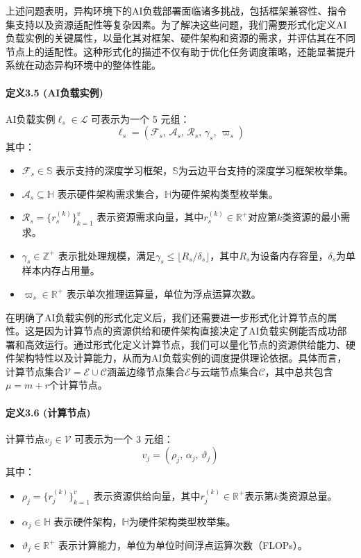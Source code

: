 上述问题表明，异构环境下的AI负载部署面临诸多挑战，包括框架兼容性、指令集支持以及资源适配性等复杂因素。为了解决这些问题，我们需要形式化定义AI负载实例的关键属性，以量化其对框架、硬件架构和资源的需求，并评估其在不同节点上的适配性。这种形式化的描述不仅有助于优化任务调度策略，还能显著提升系统在动态异构环境中的整体性能。

\paragraph{定义3.5 (AI负载实例)} AI负载实例$\ell_s \in \mathcal{L}$ 可表示为一个 5 元组：
\[
\ell_s = (\mathcal{F}_s,\, \mathcal{A}_s,\, \mathcal{R}_s,\, \gamma_s,\, \varpi_s)
\]
其中：
\begin{itemize}
    \item $\mathcal{F}_s \in \mathbb{S}$ 表示支持的深度学习框架，$\mathbb{S}$为云边平台支持的深度学习框架枚举集。
    \item $\mathcal{A}_s \subseteq \mathbb{H}$ 表示硬件架构需求集合，$\mathbb{H}$为硬件架构类型枚举集。
    \item $\mathcal{R}_s = \{r^{(k)}_s\}_{k=1}^v$ 表示资源需求向量，其中$r^{(k)}_s \in \mathbb{R}^+$对应第$k$类资源的最小需求。
    \item $\gamma_s \in \mathbb{Z}^+$ 表示批处理规模，满足$\gamma_s \leq \lfloor R_s/\delta_s \rfloor$，其中$R_s$为设备内存容量，$\delta_s$为单样本内存占用量。
    \item $\varpi_s \in \mathbb{R}^+$ 表示单次推理运算量，单位为浮点运算次数。
\end{itemize}

在明确了AI负载实例的形式化定义后，我们还需要进一步形式化计算节点的属性。这是因为计算节点的资源供给和硬件架构直接决定了AI负载实例能否成功部署和高效运行。通过形式化定义计算节点，我们可以量化节点的资源供给能力、硬件架构特性以及计算能力，从而为AI负载实例的调度提供理论依据。具体而言，计算节点集合$\mathcal{V} = \mathcal{E} \cup \mathcal{C}$涵盖边缘节点集合$\mathcal{E}$与云端节点集合$\mathcal{C}$，其中总共包含$\mu=m+r$个计算节点。

\paragraph{定义3.6 (计算节点)} 计算节点$v_j \in \mathcal{V}$ 可表示为一个 3 元组：
\[
v_j = (\rho_j,\, \alpha_j,\, \vartheta_j)
\]
其中：
\begin{itemize}
    \item $\rho_j = \{r^{(k)}_j\}_{k=1}^v$ 表示资源供给向量，其中$r^{(k)}_j \in \mathbb{R}^+$表示第$k$类资源总量。
    \item $\alpha_j \in \mathbb{H}$ 表示硬件架构，$\mathbb{H}$为硬件架构类型枚举集。
    \item $\vartheta_j \in \mathbb{R}^+$ 表示计算能力，单位为单位时间浮点运算次数（FLOPs）。
\end{itemize}


